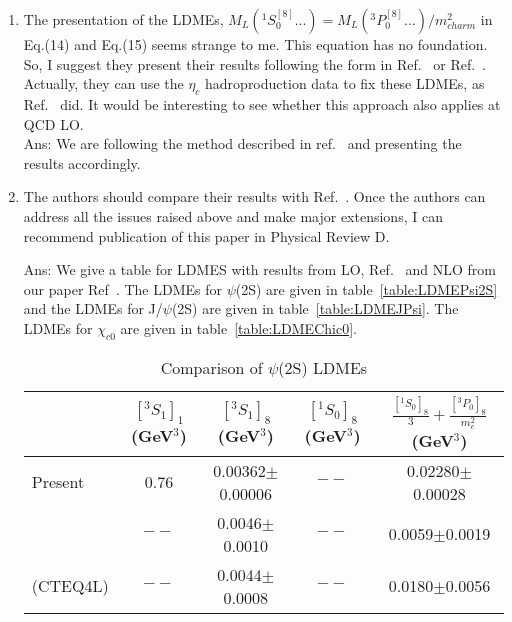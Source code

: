 \documentclass[aps,prc,preprint,superscriptaddress,showpacs,showkeys,amsmath]{revtex4-1}
\begin{document}
\begin{enumerate}
\item The presentation of the LDMEs, $M_L(^1S^{[8]}_0 ...) = M_L(^3P^{[8]}_0 ...)/m^2_{charm}$
in Eq.(14) and Eq.(15) seems strange to me. This equation has no foundation. 
So, I suggest they present their results following the form in Ref.~\cite{Beneke:1996yw} 
or Ref.~\cite{Cho:1995vh}. 
Actually, they can use the $\eta_c$ hadroproduction data to fix these LDMEs, as 
Ref.~\cite{Zhang:2014ybe} did. It would be interesting to see whether this approach also applies 
at QCD LO.\\

{\color{blue}
Ans: We are following the method described in ref.~\cite{Cho:1995vh,Beneke:1996yw} and
presenting the results accordingly.
}

\item The authors should compare their results with Ref.~\cite{Cho:1995vh, Braaten:1999qk, Sharma:2012dy}. Once the authors 
can address all the issues raised above and make major extensions, I can recommend 
publication of this paper in Physical Review D.\\
{\color{blue}
Ans: We give a table for LDMES with results from LO, Ref.~\cite{Cho:1995vh, Braaten:1999qk, Sharma:2012dy} and 
NLO from our paper Ref~\cite{Butenschoen:2010rq,Ma:2010jj}. The LDMEs for $\psi$(2S) are given in table~\ref{table:LDMEPsi2S} and 
the LDMEs for J/$\psi$(2S) are given in table~\ref{table:LDMEJPsi}. The  LDMEs for $\chi_{c0}$ are given in 
table~\ref{table:LDMEChic0}.

\begin{table}[h]
\caption{Comparison of $\psi$(2S) LDMEs}
\begin{tabular}{|l|c|c|c|c|}
\hline            
                                &$[^3S_1]_{1}$(GeV$^3$)  &$[^3S_1]_{8}$(GeV$^3$)   &$[^1S_0]_{8}$(GeV$^3$)   &$\frac{[^1S_{0}]_{8}}{3}+\frac{[^3P_0]_{8}}{m_{c}^2}$(GeV$^3$)\\

\hline
Present                         &0.76                  &0.00362$\pm$0.00006         &$--$                   &0.02280$\pm$0.00028\\
\cite{Cho:1995vh}               &$--$                  &0.0046$\pm$0.0010           &$--$                   &0.0059$\pm$0.0019\\

\cite{Beneke:1996yw}(CTEQ4L)    &$--$                  &0.0044$\pm$0.0008           &$--$                   &0.0180$\pm$0.0056\\


\end{tabular}
\end{table}}
\end{enumerate}
\end{document}
